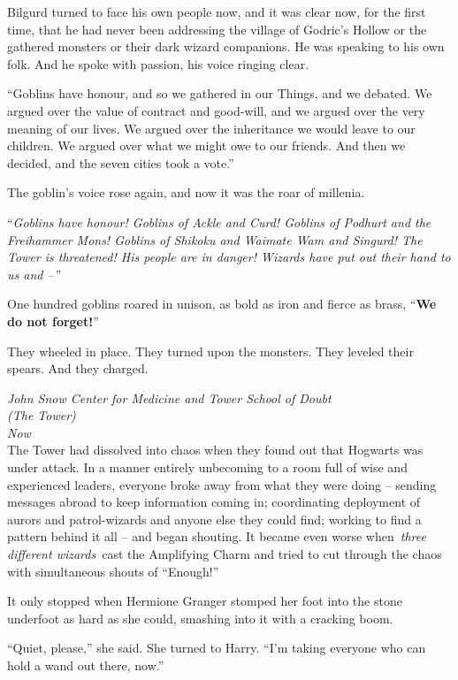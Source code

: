 Bilgurd turned to face his own people now, and it was clear now, for the
first time, that he had never been addressing the village of Godric's
Hollow or the gathered monsters or their dark wizard companions. He was
speaking to his own folk. And he spoke with passion, his voice ringing
clear.

``Goblins have honour, and so we gathered in our Things, and we debated.
We argued over the value of contract and good-will, and we argued over
the very meaning of our lives. We argued over the inheritance we would
leave to our children. We argued over what we might owe to our friends.
And then we decided, and the seven cities took a vote.''

The goblin's voice rose again, and now it was the roar of millenia.

``\emph{Goblins have honour! Goblins of Ackle and Curd! Goblins of
Podhurt and the Freihammer Mons! Goblins of Shikoku and Waimate Wam and
Singurd! The Tower is threatened! His people are in danger! Wizards have
put out their hand to us and --''}

One hundred goblins roared in unison, as bold as iron and fierce as
brass, ``\textbf{We do not forget!}''

They wheeled in place. They turned upon the monsters. They leveled their
spears. And they charged.

\mybreak

\emph{John Snow Center for Medicine and Tower School of Doubt\\
(The Tower)}\\
\emph{Now}\\

The Tower had dissolved into chaos when they found out that Hogwarts was
under attack. In a manner entirely unbecoming to a room full of wise and
experienced leaders, everyone broke away from what they were doing --
sending messages abroad to keep information coming in; coordinating
deployment of aurors and patrol-wizards and anyone else they could find;
working to find a pattern behind it all -- and began shouting. It became
even worse when~\emph{three different wizards}~cast the Amplifying Charm
and tried to cut through the chaos with simultaneous shouts of
``Enough!''

It only stopped when Hermione Granger stomped her foot into the stone
underfoot as hard as she could, smashing into it with a cracking boom.

``Quiet, please,'' she said. She turned to Harry. ``I'm taking everyone
who can hold a wand out there, now.''

